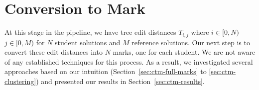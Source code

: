 \chapter{Conversion to Mark}
\label{chap:ctm}

At this stage in the pipeline, we have tree edit distances $T_{i,j}$ where $i\in[0, N)$ $j\in[0,M)$ for $N$ student solutions and $M$ reference solutions. Our next step is to convert these edit distances into $N$ marks, one for each student. We are not aware of any established techniques for this process. As a result, we investigated several approaches based on our intuition (Section~\ref{sec:ctm-full-marks} to \ref{sec:ctm-clustering}) and presented our results in Section~\ref{sec:ctm-results}.








